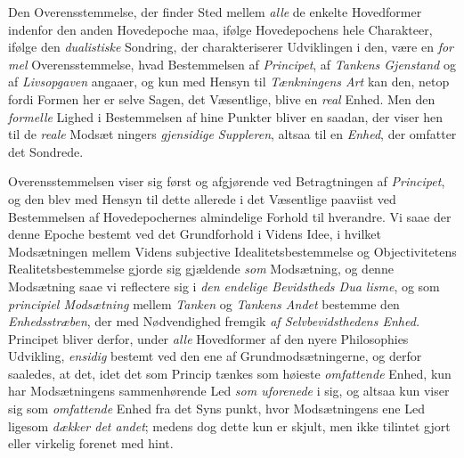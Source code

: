 Den Overensstemmelse, der finder Sted mellem \emph{alle} de
enkelte Hovedformer indenfor den anden Hovedepoche maa,
ifølge Hovedepochens hele Charakteer, ifølge den \emph{dualistiske}
 Sondring, der charakteriserer Udviklingen i den, være en \emph{for\-%
mel} Overensstemmelse, hvad Bestemmelsen af \emph{Principet},
af \emph{Tankens Gjenstand} og af \emph{Livsopgaven} angaaer, og
kun med Hensyn til \emph{Tænkningens Art} kan den, netop fordi
Formen her er selve Sagen, det Væsentlige, blive en \emph{real}
Enhed. Men den \emph{formelle} Lighed i Bestemmelsen af hine
Punkter bliver en saadan, der viser hen til de \emph{reale} Modsæt\-%
ningers \emph{gjensidige Suppleren}, altsaa til en \emph{Enhed}, der
omfatter det Sondrede.

Overensstemmelsen viser sig først og afgjørende ved
Betragtningen af \emph{Principet}, og den blev med Hensyn til
dette allerede i det Væsentlige paaviist ved Bestemmelsen
af Hovedepochernes almindelige Forhold til hverandre. Vi
saae der denne Epoche bestemt ved det Grundforhold i
Videns Idee, i hvilket Modsætningen mellem Videns subjective
Idealitetsbestemmelse og Objectivitetens Realitetsbestemmelse
gjorde sig gjældende \emph{som} Modsætning, og denne Modsætning
saae vi reflectere sig i \emph{den endelige Bevidstheds Dua\-%
lisme}, og som \emph{principiel Modsætning} mellem \emph{Tanken}
og \emph{Tankens Andet} bestemme den \emph{Enhedsstræben}, der
med Nødvendighed fremgik \emph{af Selvbevidsthedens Enhed.}
Principet bliver derfor, under \emph{alle} Hovedformer af den nyere
Philosophies Udvikling, \emph{ensidig} bestemt ved den ene af
Grundmodsætningerne, og derfor saaledes, at det, idet det som
Princip tænkes som høieste \emph{omfattende} Enhed, kun har
Modsætningens sammenhørende Led \emph{som uforenede} i sig,
og altsaa kun viser sig som \emph{omfattende} Enhed fra det Syns\-%
punkt, hvor Modsætningens ene Led ligesom \emph{dækker det
andet}; medens dog dette kun er skjult, men ikke tilintet\-%
gjort eller virkelig forenet med hint.

